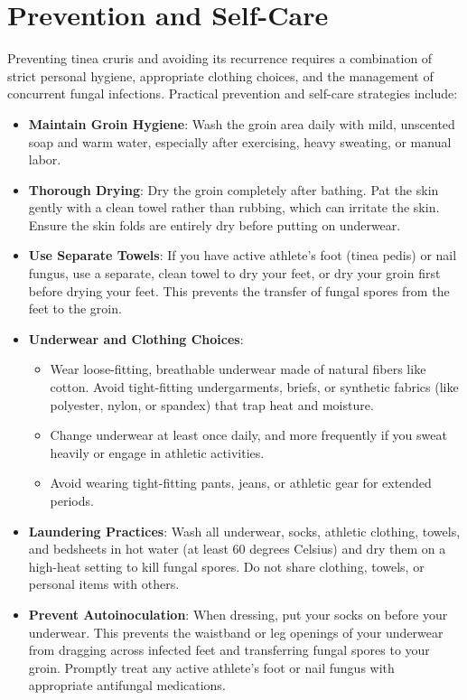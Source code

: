 \section*{Prevention and Self-Care}
Preventing tinea cruris and avoiding its recurrence requires a combination of strict personal hygiene, appropriate clothing choices, and the management of concurrent fungal infections.
Practical prevention and self-care strategies include:
\begin{itemize}
    \item \textbf{Maintain Groin Hygiene}: Wash the groin area daily with mild, unscented soap and warm water, especially after exercising, heavy sweating, or manual labor.
    \item \textbf{Thorough Drying}: Dry the groin completely after bathing. Pat the skin gently with a clean towel rather than rubbing, which can irritate the skin. Ensure the skin folds are entirely dry before putting on underwear.
    \item \textbf{Use Separate Towels}: If you have active athlete's foot (tinea pedis) or nail fungus, use a separate, clean towel to dry your feet, or dry your groin first before drying your feet. This prevents the transfer of fungal spores from the feet to the groin.
    \item \textbf{Underwear and Clothing Choices}:
    \begin{itemize}
        \item Wear loose-fitting, breathable underwear made of natural fibers like cotton. Avoid tight-fitting undergarments, briefs, or synthetic fabrics (like polyester, nylon, or spandex) that trap heat and moisture.
        \item Change underwear at least once daily, and more frequently if you sweat heavily or engage in athletic activities.
        \item Avoid wearing tight-fitting pants, jeans, or athletic gear for extended periods.
    \end{itemize}
    \item \textbf{Laundering Practices}: Wash all underwear, socks, athletic clothing, towels, and bedsheets in hot water (at least 60 degrees Celsius) and dry them on a high-heat setting to kill fungal spores. Do not share clothing, towels, or personal items with others.
    \item \textbf{Prevent Autoinoculation}: When dressing, put your socks on before your underwear. This prevents the waistband or leg openings of your underwear from dragging across infected feet and transferring fungal spores to your groin. Promptly treat any active athlete's foot or nail fungus with appropriate antifungal medications.

\end{itemize}
